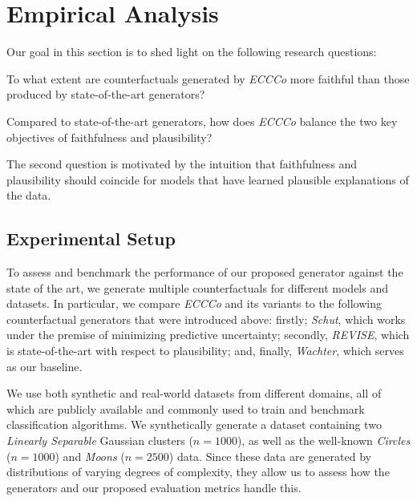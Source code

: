 \section{Empirical Analysis}\label{emp}

Our goal in this section is to shed light on the following research questions:

\begin{question}[Faithfulness]\label{rq:faithfulness}
  To what extent are counterfactuals generated by \textit{ECCCo} more faithful than those produced by state-of-the-art generators?
\end{question}

\begin{question}\label{rq:plausibility}
  Compared to state-of-the-art generators, how does \textit{ECCCo} balance the two key objectives of faithfulness and plausibility?
\end{question}

The second question is motivated by the intuition that faithfulness and plausibility should coincide for models that have learned plausible explanations of the data.

\subsection{Experimental Setup}

To assess and benchmark the performance of our proposed generator against the state of the art, we generate multiple counterfactuals for different models and datasets. In particular, we compare \textit{ECCCo} and its variants to the following counterfactual generators that were introduced above: firstly; \textit{Schut}, which works under the premise of minimizing predictive uncertainty; secondly, \textit{REVISE}, which is state-of-the-art with respect to plausibility; and, finally, \textit{Wachter}, which serves as our baseline. 

We use both synthetic and real-world datasets from different domains, all of which are publicly available and commonly used to train and benchmark classification algorithms. We synthetically generate a dataset containing two \textit{Linearly Separable} Gaussian clusters ($n=1000$), as well as the well-known \textit{Circles} ($n=1000$) and \textit{Moons} ($n=2500$) data. Since these data are generated by distributions of varying degrees of complexity, they allow us to assess how the generators and our proposed evaluation metrics handle this.

